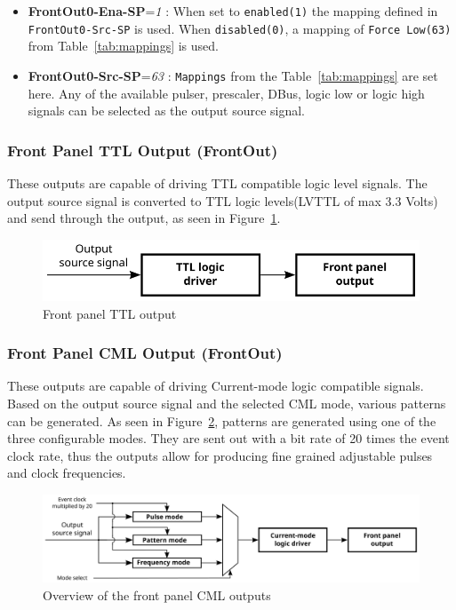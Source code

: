 \documentclass[12pt,a4paper]{article}
\begin{document}
  \begin{itemize}
  \item
   \textbf{FrontOut0-Ena-SP}=\emph{1} : When set to \texttt{enabled(1)} the mapping
    defined in \texttt{FrontOut0-Src-SP} is used. When \texttt{disabled(0)}, a
    mapping of \texttt{Force Low(63)} from Table~\ref{tab:mappings} is used.
  \item
    \textbf{FrontOut0-Src-SP}=\emph{63} : \texttt{Mappings} from the Table~\ref{tab:mappings} are
    set here. Any of the available pulser, prescaler, DBus, logic low or
    logic high signals can be selected as the output source signal.
  \end{itemize}

\subsubsection{Front Panel TTL Output (FrontOut)}\label{sec:Front Panel TTL Output}
These outputs are capable of driving TTL compatible logic level signals. The output source signal is converted to TTL logic levels(LVTTL of max 3.3 Volts) and send through the output, as seen in Figure~\ref{fig:output_ttl}.

\begin{figure}[H]
	\centering
	\includegraphics[]{./img/TTL}
	\caption{Front panel TTL output}
	\label{fig:output_ttl}
\end{figure}

\subsubsection{Front Panel CML Output (FrontOut)}\label{sec:Front Panel CML Output}
These outputs are capable of driving Current-mode logic compatible signals. Based on the output source signal and the selected CML mode, various patterns can be generated. As seen in Figure~\ref{fig:output_cml}, patterns are generated using one of the three configurable modes. They are sent out with a bit rate of 20 times the event clock rate, thus the outputs allow for producing fine grained adjustable pulses and clock frequencies.
\begin{figure}[H]
	\centering
	\includegraphics[width=\columnwidth]{./img/CML}
	\caption{Overview of the front panel CML outputs}
	\label{fig:output_cml}
\end{figure}
\end{document}

